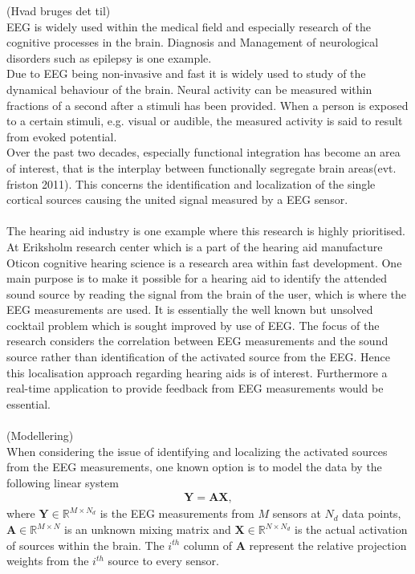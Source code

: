 (Hvad bruges det til)\\
EEG is widely used within the medical field and especially research of the cognitive processes in the brain. Diagnosis and Management of neurological disorders such as epilepsy is one example. \\   

Due to EEG being non-invasive and fast it is widely used to study of the dynamical behaviour of the brain. Neural activity can be measured within fractions of a second after a stimuli has been provided\cite[p. 3]{fundamentalEEG}. When a person is exposed to a certain stimuli, e.g. visual or audible, the measured activity is said to result from evoked potential.\\
Over the past two decades, especially functional integration has become an area of interest, that is the interplay between functionally segregate brain areas\cite{Van2019}(evt. friston 2011). This concerns the identification and localization of the single cortical sources causing the united signal measured by a EEG sensor.\\ 
\\
The hearing aid industry is one example where this research is highly prioritised. At Eriksholm research center which is a part of the hearing aid manufacture Oticon cognitive hearing science is a research area within fast development. One main purpose is to make it possible for a hearing aid to identify the attended sound source by reading the signal from the brain of the user, which is where the EEG measurements are used\cite{Emina2019}\cite{Bech2018}. It is essentially the well known but unsolved cocktail problem which is sought improved by use of EEG. The focus of the research considers the correlation between EEG measurements and the sound source rather than identification of the activated source from the EEG. Hence this localisation approach regarding hearing aids is of interest. Furthermore a real-time application to provide feedback from EEG measurements would be essential. \\ \\
(Modellering)\\
When considering the issue of identifying and localizing the activated sources from the EEG measurements, one known option is to model the data by the following linear system 
\begin{align*}
\mathbf{Y} = \mathbf{AX},
\end{align*}
where $\mathbf{Y} \in \mathbb{R}^{M\times N_d}$ is the EEG measurements from $M$ sensors at $N_d$ data points, $\mathbf{A} \in \mathbb{R}^{M \times N}$ is an unknown mixing matrix and $\mathbf{X} \in \mathbb{R}^{N \times N_d}$ is the actual activation of sources within the brain. The $i^{th}$ column of $\textbf{A}$ represent the relative projection weights from the $i^{th}$ source to every sensor\cite{phd2015}. 

